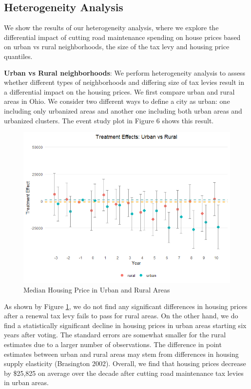 \subsection{Heterogeneity Analysis} 

We show the results of our heterogeneity analysis, where we explore the differential impact of cutting road maintenance spending on house prices based on urban vs rural neighborhoods, the size of the tax levy and housing price quantiles.

\vskip 0.5cm

\textbf{Urban vs Rural neighborhoods}: We perform heterogeneity analysis to assess whether different types of neighborhoods and differing size of tax levies result in a differential impact on the housing prices. We first compare urban and rural areas in Ohio. We consider two different ways to define a city as urban:  one including only urbanized areas and another one including both urban areas and urbanized clusters. The event study plot in Figure 6 shows this result. 

\begin{figure}[htbp]
    \centering
    \includegraphics[width=\textwidth,keepaspectratio]{images/tes_covs_ua_reg.png}        
    \caption{Median Housing Price in Urban and Rural Areas}
    \label{fig:tes_covs_ua}
\end{figure}

As shown by Figure \ref{fig:tes_covs_ua}, we do not find any significant differences in housing prices after a renewal tax levy fails to pass for rural areas. On the other hand, we do find a statistically significant decline in housing prices in urban areas starting six years after voting. The standard errors are somewhat smaller for the rural estimates due to a larger number of observations. The difference in point estimates between urban and rural areas may stem from differences in housing supply elasticity (Brasington 2002). Overall, we find that housing prices decrease by \$25,825 on average over the decade after cutting road maintenance tax levies in urban areas. 

